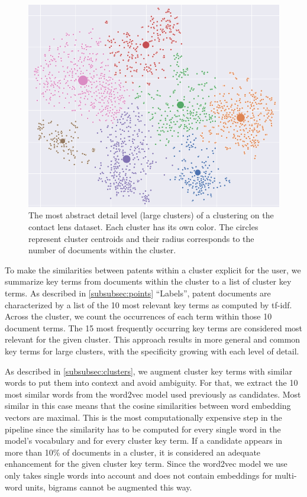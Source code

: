 \begin{figure}[!]
\centering
\includegraphics[width=\textwidth]{img/contact_lens_large}
\caption{The most abstract detail level (large clusters) of a clustering on the contact lens dataset. Each cluster has its own color. The circles represent cluster centroids and their radius corresponds to the number of documents within the cluster.}
\label{fig:contact_lens_large}
\end{figure}

To make the similarities between patents within a cluster explicit for the user, we summarize key terms from documents within the cluster to a list of cluster key terms.
As described in \autoref{subsubsec:points} ``Labels'', patent documents are characterized by a list of the 10 most relevant key terms as computed by \gls{tf-idf}.
Across the cluster, we count the occurrences of each term within those 10 document terms.
The 15 most frequently occurring key terms are considered most relevant for the given cluster.
This approach results in more general and common key terms for large clusters, with the specificity growing with each level of detail.

As described in \autoref{subsubsec:clusters}, we augment cluster key terms with similar words to put them into context and avoid ambiguity.
For that, we extract the 10 most similar words from the word2vec model used previously as candidates.
Most similar in this case means that the cosine similarities between word embedding vectors are maximal.
This is the most computationally expensive step in the pipeline since the similarity has to be computed for every single word in the model's vocabulary and for every cluster key term.
If a candidate appears in more than 10\% of documents in a cluster, it is considered an adequate enhancement for the given cluster key term.
Since the word2vec model we use only takes single words into account and does not contain embeddings for multi-word units, bigrams cannot be augmented this way.

